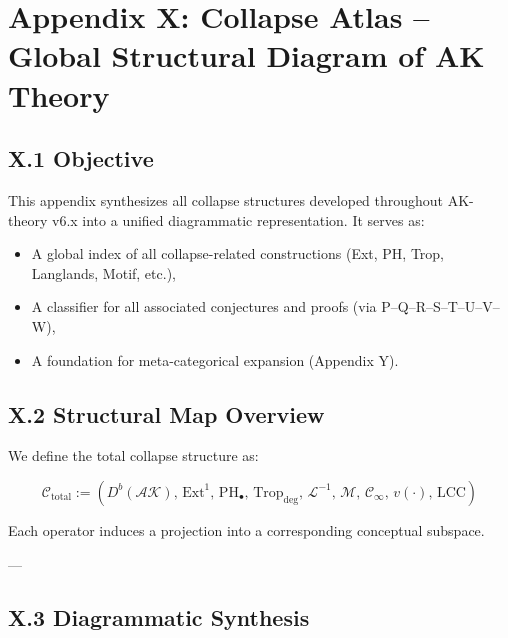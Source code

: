 \documentclass[11pt]{article}
\begin{document}

\section*{Appendix X: Collapse Atlas – Global Structural Diagram of AK Theory}

\subsection*{X.1 Objective}

This appendix synthesizes all collapse structures developed throughout AK-theory v6.x  
into a unified diagrammatic representation. It serves as:

\begin{itemize}
  \item A global index of all collapse-related constructions (Ext, PH, Trop, Langlands, Motif, etc.),
  \item A classifier for all associated conjectures and proofs (via P–Q–R–S–T–U–V–W),
  \item A foundation for meta-categorical expansion (Appendix Y).
\end{itemize}

\subsection*{X.2 Structural Map Overview}

We define the total collapse structure as:

\[
\mathcal{C}_{\mathrm{total}} :=
\left(
  D^b(\mathcal{AK}), \,
  \mathrm{Ext}^1, \,
  \mathrm{PH}_\bullet, \,
  \mathrm{Trop}_{\mathrm{deg}}, \,
  \mathcal{L}^{-1}, \,
  \mathcal{M}, \,
  \mathscr{C}_\infty, \,
  v(\cdot), \,
  \mathrm{LCC}
\right)
\]

Each operator induces a projection into a corresponding conceptual subspace.

---

\subsection*{X.3 Diagrammatic Synthesis}
\end{document}
